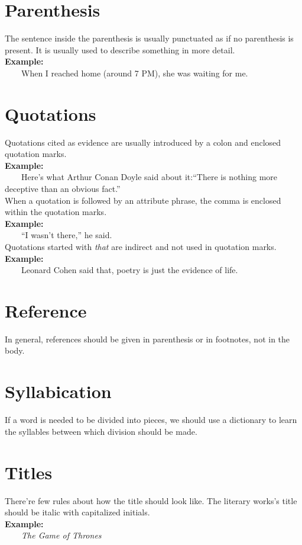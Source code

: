 \documentclass{report}
\newcommand{\xmpl}{\textbf{Example:}\\} %
\newcommand{\indnt}{\ \ \ \ } %
\begin{document}
\section{Parenthesis}
The sentence inside the parenthesis is usually punctuated as if no parenthesis is present. It is usually used to describe something in more detail.\\
\xmpl
\indnt When I reached home (around 7 PM), she was waiting for me.
\section{Quotations}
Quotations cited as evidence are usually introduced by a colon and enclosed quotation marks.\\
\xmpl
\indnt Here's what Arthur Conan Doyle said about it:``There is nothing more deceptive than an obvious fact.''\\
When a quotation is followed by an attribute phrase, the comma is enclosed within the quotation marks.\\
\xmpl
\indnt ``I wasn't there,'' he said.\\
Quotations started with \textit{that} are indirect and not used in quotation marks.\\
\xmpl
\indnt Leonard Cohen said that, poetry is just the evidence of life.\\
\section{Reference}
In general, references should be given in parenthesis or in footnotes, not in the body.
\section{Syllabication}
If a word is needed to be divided into pieces, we should use a dictionary to learn the syllables between which division should be made.
\section{Titles}
There're few rules about how the title should look like. The literary works's title should be italic with capitalized initials.\\
\xmpl
\indnt \textit{The Game of Thrones}
\end{document}

